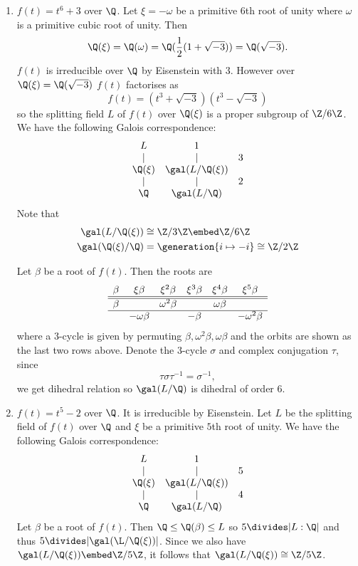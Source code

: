 \documentclass[a4paper]{article}
\begin{document}
\begin{eg}\leavevmode
  \begin{enumerate}
  \item \(f(t) = t^6 + 3\) over \(\Q\). Let \(\xi = - \omega\) be a primitive \(6\)th root of unity where \(\omega\) is a primitive cubic root of unity. Then
  \[
    \Q(\xi) = \Q(\omega) = \Q(\frac{1}{2}(1 + \sqrt{-3})) = \Q(\sqrt{-3}).
  \]
  \(f(t)\) is irreducible over \(\Q\) by Eisenstein with \(3\). However over \(\Q(\xi) = \Q(\sqrt{-3})\) \(f(t)\) factorises as
  \[
    f(t) = (t^3 + \sqrt{-3}) (t^3 - \sqrt{-3})
  \]
  so the splitting field \(L\) of \(f(t)\) over \(\Q(\xi)\) is a proper subgroup of \(\Z/6\Z\). We have the following Galois correspondence:
  \[
    \begin{array}[h]{ccc}
      L & 1 & \\
      | & | & 3 \\
      \Q(\xi) & \gal(L/\Q(\xi)) & \\
      | & | & 2 \\
      \Q & \gal(L/\Q) &
    \end{array}
  \]
   Note that
   \begin{align*}
     \gal(L/\Q(\xi)) &\cong \Z/3\Z \embed \Z/6\Z \\
     \gal(\Q(\xi)/\Q) &= \generation{i \mapsto -i} \cong \Z/2\Z
   \end{align*}

   Let \(\beta\) be a root of \(f(t)\). Then the roots are
   \[
     \begin{array}[h]{cccccc}
       \beta & \xi \beta & \xi^2 \beta & \xi^3 \beta & \xi^4 \beta & \xi^5 \beta \\ \hline \hline
       \beta & & \omega^2 \beta & & \omega\beta & \\ \hline
       & - \omega \beta & & - \beta & & - \omega^2 \beta
     \end{array}
   \]
   where a \(3\)-cycle is given by permuting \(\beta, \omega^2 \beta, \omega \beta\) and the orbits are shown as the last two rows above. Denote the \(3\)-cycle \(\sigma\) and complex conjugation \(\tau\), since
   \[
     \tau \sigma \tau^{-1} = \sigma^{-1},
   \]
   we get dihedral relation so \(\gal(L/\Q)\) is dihedral of order \(6\).
 \item \(f(t) = t^5 - 2\) over \(\Q\). It is irreducible by Eisenstein. Let \(L\) be the splitting field of \(f(t)\) over \(\Q\) and \(\xi\) be a primitive \(5\)th root of unity. We have the following Galois correspondence:
   \[
     \begin{array}[h]{ccc}
       L & 1 & \\
       | & | & 5 \\
       \Q(\xi) & \gal(L/\Q(\xi)) & \\
       | & | & 4 \\
       \Q & \gal(L/\Q)
     \end{array}
   \]
   Let \(\beta\) be a root of \(f(t)\). Then \(\Q \leq \Q(\beta) \leq L\) so \(5 \divides |L:\Q|\) and thus \(5 \divides |\gal(\L/\Q(\xi))|\). Since we also have \(\gal(L/\Q(\xi)) \embed \Z/5\Z\), it follows that \(\gal(L/\Q(\xi)) \cong \Z/5\Z\).


\end{enumerate}
\end{eg}
\end{document}
